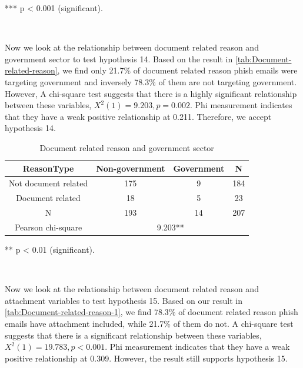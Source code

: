 {*}{*}{*} p < 0.001 (significant).

\ 

Now we look at the relationship between document related reason and
government sector to test hypothesis 14. Based on the result in \autoref{tab:Document-related-reason},
we find only 21.7\% of document related reason phish emails were targeting
government and inversely 78.3\% of them are not targeting government.
However, A chi-square test suggests that there is a highly significant
relationship between these variables, $X^{2}(1)=9.203,p=0.002$. Phi
measurement indicates that they have a weak positive relationship
at 0.211. Therefore, we accept hypothesis 14.

\begin{minipage}[t]{1\columnwidth}%
\begin{longtable}{cccc}
\caption{\label{tab:Document-related-reason}Document related reason and government
sector}
\tabularnewline
\toprule 
{\footnotesize{}ReasonType} & {\footnotesize{}Non-government} & {\footnotesize{}Government} & \multirow{1}{*}{{\footnotesize{}N}}\tabularnewline
\midrule 
\multirow{1}{*}{{\footnotesize{}Not document related}} & {\footnotesize{}175} & {\footnotesize{}9} & \multirow{1}{*}{{\footnotesize{}184}}\tabularnewline
\midrule 
\multirow{1}{*}{{\footnotesize{}Document related}} & {\footnotesize{}18} & {\footnotesize{}5} & \multirow{1}{*}{{\footnotesize{}23}}\tabularnewline
\midrule 
{\footnotesize{}N} & {\footnotesize{}193} & {\footnotesize{}14} & {\footnotesize{}207}\tabularnewline
\midrule 
{\footnotesize{}Pearson chi-square} & \multicolumn{3}{c}{{\footnotesize{}9.203{*}{*}}}\tabularnewline
\midrule
\end{longtable}%
\end{minipage}

{*}{*} p < 0.01 (significant).

\ 

Now we look at the relationship between document related reason and
attachment variables to test hypothesis 15. Based on our result in
\autoref{tab:Document-related-reason-1}, we find 78.3\% of document
related reason phish emails have attachment included, while 21.7\%
of them do not. A chi-square test suggests that there is a significant
relationship between these variables, $X^{2}(1)=19.783,p<0.001$.
Phi measurement indicates that they have a weak positive relationship
at 0.309. However, the result still supports hypothesis 15.

